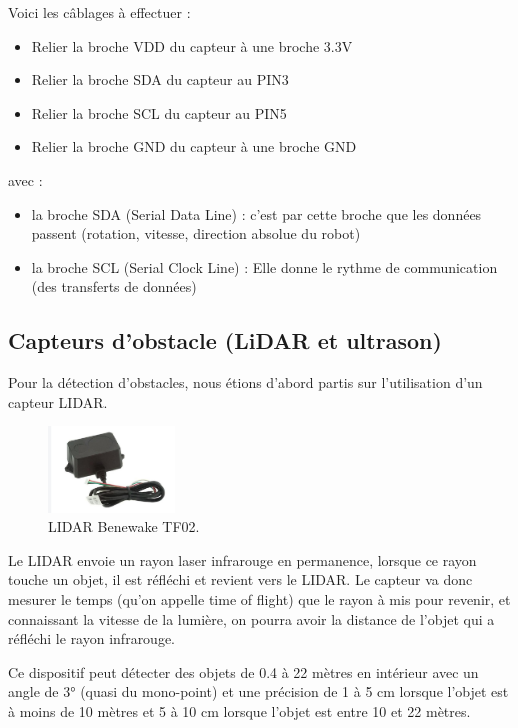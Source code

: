 \documentclass[a4paper,12pt]{report}  %
\begin{document}
Voici les câblages à effectuer :

\begin{itemize}
	\item Relier la broche VDD du capteur à une broche 3.3V
	\item Relier la broche SDA du capteur au PIN3 
	\item Relier la broche SCL du capteur au PIN5 
	\item Relier la broche GND du capteur à une broche GND
\end{itemize}

avec : 

\begin{itemize}
	\item la broche SDA (Serial Data Line) : c’est par cette broche que les données passent (rotation, vitesse, direction absolue du robot)
	\item la broche SCL (Serial Clock Line) : Elle donne le rythme de communication (des transferts de données)
\end{itemize}


\subsection{Capteurs d’obstacle (LiDAR et ultrason)}

Pour la détection d’obstacles, nous étions d’abord partis sur l’utilisation d’un capteur LIDAR.

\begin{figure}[H]
	\centering
	\includegraphics[width=0.3\textwidth]{./attachments/capteur_lidar.jpg}
	\caption{LIDAR Benewake TF02.}
	
\end{figure}

Le LIDAR envoie un rayon laser infrarouge en permanence, lorsque ce rayon touche un objet, il est réfléchi et revient vers le LIDAR. Le capteur va donc mesurer le temps (qu’on appelle time of flight) que le rayon à mis pour revenir, et connaissant la vitesse de la lumière, on pourra avoir la distance de l’objet qui a réfléchi le rayon infrarouge. 

Ce dispositif peut détecter des objets de 0.4 à 22 mètres en intérieur avec un angle de 3° (quasi du mono-point) et une précision de 1 à 5 cm lorsque l’objet est à moins de 10 mètres et 5 à 10 cm lorsque l’objet est entre 10 et 22 mètres. 
\end{document}
